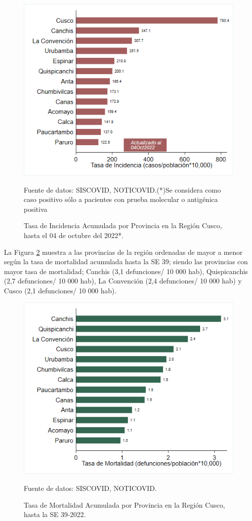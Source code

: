 \documentclass[12pt,a4paper,openany]{book}
\begin{document}
	\begin{figure}[!htpb]
		\caption{Tasa de Incidencia Acumulada por Provincia en la Región Cusco, hasta el 04 de octubre del 2022*. }\label{fig:incidencia_provincias}
		\begin{center}
			\includegraphics[width=0.60\linewidth]{../figuras/incidencia_provincial_2022.png}
		\end{center}
		{\footnotesize {
				Fuente de datos: SISCOVID, NOTICOVID.(*)Se considera como caso positivo sólo a pacientes con prueba molecular o antigénica positiva}}
	\end{figure}
	
	La Figura \ref{fig:mortalidad_ordenada} muestra a las provincias de la región ordenadas de mayor a menor según la tasa de mortalidad acumulada hasta la SE 39; siendo las provincias con mayor tasa de mortalidad;  Canchis (3,1 defunciones/ 10 000 hab), Quispicanchis (2,7 defunciones/ 10 000 hab), La Convención (2,4 defunciones/ 10 000 hab) y Cusco (2,1 defunciones/ 10 000 hab).
	
	\begin{figure}[h]
		\caption{Tasa de Mortalidad Acumulada por Provincia en la Región Cusco, hasta la SE 39-2022. }\label{fig:mortalidad_ordenada}
		\begin{center}
			\includegraphics[width=0.60\linewidth]{../figuras/mortalidad_provincial_2022.png}
		\end{center}
		{\footnotesize {Fuente de datos: SISCOVID, NOTICOVID.}}
	\end{figure}
	
\end{document}
